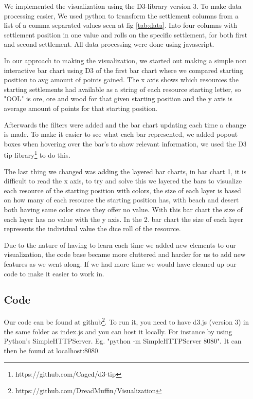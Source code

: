 \documentclass[journal]{vgtc}                %
\begin{document}
We implemented the visualization using the D3-library version 3. To make
data processing easier, We used python to transform the settlement columns
from a list of a comma separated values seen at fig \ref{tab:data}. Into
four columns with settlement position in one value and rolls on the specific
settlement, for both first and second settlement. All data processing were
done using javascript.

In our approach to making the visualization, we started out making a simple non
interactive bar chart using D3 of the first bar chart where we compared starting position to avg amount of points gained.
The x axis shows which resources the starting settlements had available as a string of each resource starting letter,
so "OOL" is ore, ore and wood for that given starting position and the y axis is average amount of points for that starting position.

Afterwards the filters were added and the bar chart updating each time a change is made.
To make it easier to see what each bar represented, we added popout boxes when
hovering over the bar's to show relevant information, we used the D3 tip library\footnote{https://github.com/Caged/d3-tip}
to do this.

The last thing we changed was adding the layered bar charts,
in bar chart 1, it is difficult to read the x axis, to try and solve this we layered
the bars to visualize each resource of the starting position with colors,
the size of each layer is based on how many of each resource the starting position has,
with beach and desert both having same color since they offer no value. With this bar chart
the size of each layer has no value with the y axis. In the 2. bar chart the size of each
layer represents the individual value the dice roll of the resource.

Due to the nature of having to learn each time we added new elements to our visualization, the code base became more cluttered and harder for us to add new features as we went along. If we had more time we would have cleaned up our code to make it easier to work in.

\subsection{Code}

Our code can be found at 
github\footnote{https://github.com/DreadMuffin/Visualization}. To run it, you
need to have d3.js (version 3) in the same folder as index.js and you can host
it locally. For instance by using Python's SimpleHTTPServer. Eg. "python -m
SimpleHTTPServer 8080". It can then be found at localhost:8080.
\end{document}
